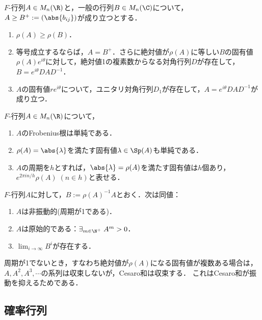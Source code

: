 \documentclass[uplatex, dvipdfmx]{jsreport}
\begin{document}
\begin{theorem}[$F$-行列の対角化]
    $F$-行列$A\in M_n(\R)$と，一般の行列$B\in M_n(\C)$について，$A\ge B^+:=(\abs{b_{ij}})$が成り立つとする．
    \begin{enumerate}
        \item $\rho(A)\ge\rho(B)$．
        \item 等号成立するならば，$A=B^+$．さらに絶対値が$\rho(A)$に等しい$B$の固有値$\rho(A)e^{i\theta}$に対して，絶対値1の複素数からなる対角行列$D$が存在して，$B=e^{i\theta}DAD^{-1}$．
        \item $A$の固有値$re^{i\theta}$について，ユニタリ対角行列$D_1$が存在して，$A=e^{i\theta}DAD^{-1}$が成り立つ．
    \end{enumerate}
\end{theorem}

\begin{theorem}[周期と最大絶対値を持つ固有値の対応]
    $F$-行列$A\in M_n(\R)$について，
    \begin{enumerate}
        \item $A$のFrobenius根は単純である．
        \item $\rho(A)=\abs{\lambda}$を満たす固有値$\lambda\in\Sp(A)$も単純である．
        \item $A$の周期を$h$とすれば，$\abs{\lambda}=\rho(A)$を満たす固有値は$h$個あり，$e^{2\pi in/h}\rho(A)\;(n\in h)$と表せる．
    \end{enumerate}
\end{theorem}

\begin{theorem}[極限の存在条件]
    $F$-行列$A$に対して，$B:=\rho(A)^{-1}A$とおく．次は同値：
    \begin{enumerate}
        \item $A$は非振動的(周期が1である)．
        \item $A$は原始的である：$\exists_{m\in\N^+}\;A^m>0$．
        \item $\lim_{i\to\infty}B^i$が存在する．
    \end{enumerate}
\end{theorem}
\begin{remarks}
    周期が1でないとき，すなわち絶対値が$\rho(A)$になる固有値が複数ある場合は，$A,A^2,A^3,\cdots$の系列は収束しないが，Cesaro和は収束する．
    これはCesaro和が振動を抑えるためである．
\end{remarks}

\subsection{確率行列}
\end{document}

